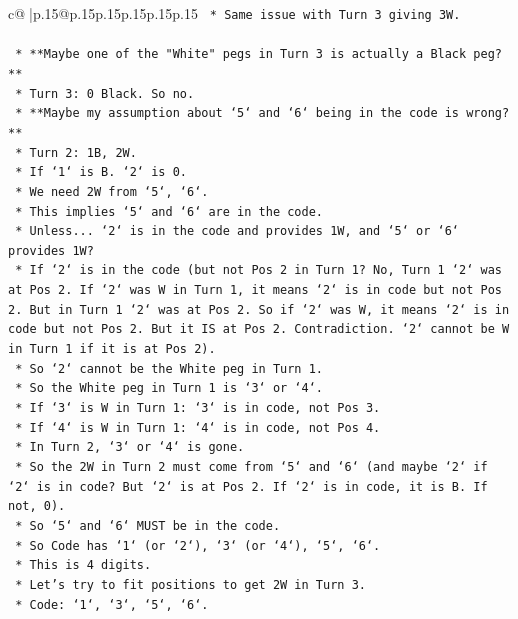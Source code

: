 \documentclass{article}
\begin{document}
{\begin{supertabular}{c@{$\;$}|p{.15\linewidth}@{}p{.15\linewidth}p{.15\linewidth}p{.15\linewidth}p{.15\linewidth}p{.15\linewidth}}
{{{\texttt{        *   Same issue with Turn 3 giving 3W.} \\
\\ 
\texttt{    *   **Maybe one of the "White" pegs in Turn 3 is actually a Black peg?**} \\
\texttt{        *   Turn 3: 0 Black. So no.} \\
\texttt{    *   **Maybe my assumption about `5` and `6` being in the code is wrong?**} \\
\texttt{        *   Turn 2: 1B, 2W.} \\
\texttt{        *   If `1` is B. `2` is 0.} \\
\texttt{        *   We need 2W from `5`, `6`.} \\
\texttt{        *   This implies `5` and `6` are in the code.} \\
\texttt{        *   Unless... `2` is in the code and provides 1W, and `5` or `6` provides 1W?} \\
\texttt{        *   If `2` is in the code (but not Pos 2 in Turn 1? No, Turn 1 `2` was at Pos 2. If `2` was W in Turn 1, it means `2` is in code but not Pos 2. But in Turn 1 `2` was at Pos 2. So if `2` was W, it means `2` is in code but not Pos 2. But it IS at Pos 2. Contradiction. `2` cannot be W in Turn 1 if it is at Pos 2).} \\
\texttt{        *   So `2` cannot be the White peg in Turn 1.} \\
\texttt{        *   So the White peg in Turn 1 is `3` or `4`.} \\
\texttt{        *   If `3` is W in Turn 1: `3` is in code, not Pos 3.} \\
\texttt{        *   If `4` is W in Turn 1: `4` is in code, not Pos 4.} \\
\texttt{        *   In Turn 2, `3` or `4` is gone.} \\
\texttt{        *   So the 2W in Turn 2 must come from `5` and `6` (and maybe `2` if `2` is in code? But `2` is at Pos 2. If `2` is in code, it is B. If not, 0).} \\
\texttt{        *   So `5` and `6` MUST be in the code.} \\
\texttt{        *   So Code has `1` (or `2`), `3` (or `4`), `5`, `6`.} \\
\texttt{        *   This is 4 digits.} \\
\texttt{        *   Let's try to fit positions to get 2W in Turn 3.} \\
\texttt{        *   Code: `1`, `3`, `5`, `6`.} \\
}}}
\end{supertabular}}
\end{document}
